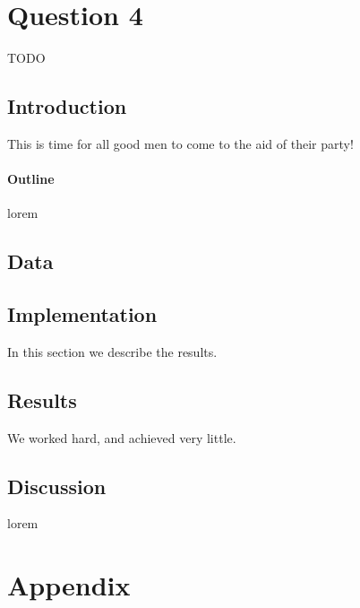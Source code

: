 \documentclass[12pt]{article}
\begin{document}
\section{Question 4}
TODO
\subsection{Introduction}
This is time for all good men to come to the aid of their party!

\paragraph{Outline}
lorem

\subsection{Data}

\subsection{Implementation}
In this section we describe the results.

\subsection{Results}
We worked hard, and achieved very little.

\subsection{Discussion}
lorem




\section{Appendix}
\end{document}
